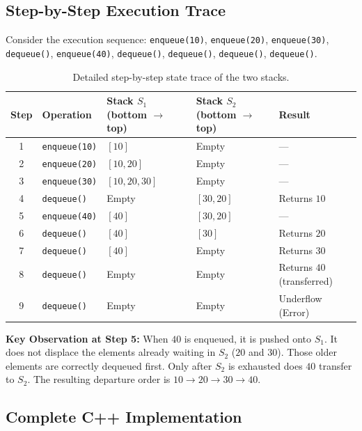 \subsection{Step-by-Step Execution Trace}

Consider the execution sequence:
\texttt{enqueue(10)}, \texttt{enqueue(20)}, \texttt{enqueue(30)}, \texttt{dequeue()}, \texttt{enqueue(40)}, \texttt{dequeue()}, \texttt{dequeue()}, \texttt{dequeue()}, \texttt{dequeue()}.

\begin{table}[htbp]
\centering
\small
\begin{tabularx}{\textwidth}{c l X X l}
\toprule
\textbf{Step} & \textbf{Operation} & \textbf{Stack $S_1$ (bottom $\to$ top)} & \textbf{Stack $S_2$ (bottom $\to$ top)} & \textbf{Result} \\
\midrule
1 & \texttt{enqueue(10)} & $[10]$         & Empty       & --- \\
2 & \texttt{enqueue(20)} & $[10, 20]$     & Empty       & --- \\
3 & \texttt{enqueue(30)} & $[10, 20, 30]$ & Empty       & --- \\
4 & \texttt{dequeue()}   & Empty          & $[30, 20]$  & Returns $10$ \\
5 & \texttt{enqueue(40)} & $[40]$         & $[30, 20]$  & --- \\
6 & \texttt{dequeue()}   & $[40]$         & $[30]$      & Returns $20$ \\
7 & \texttt{dequeue()}   & $[40]$         & Empty       & Returns $30$ \\
8 & \texttt{dequeue()}   & Empty          & Empty       & Returns $40$ (transferred) \\
9 & \texttt{dequeue()}   & Empty          & Empty       & Underflow (Error) \\
\bottomrule
\end{tabularx}
\caption{Detailed step-by-step state trace of the two stacks.}
\end{table}

\textbf{Key Observation at Step 5:} When $40$ is enqueued, it is pushed onto $S_1$. It does not displace the elements already waiting in $S_2$ ($20$ and $30$). Those older elements are correctly dequeued first. Only after $S_2$ is exhausted does $40$ transfer to $S_2$. The resulting departure order is $10 \to 20 \to 30 \to 40$.

\subsection{Complete C++ Implementation}

